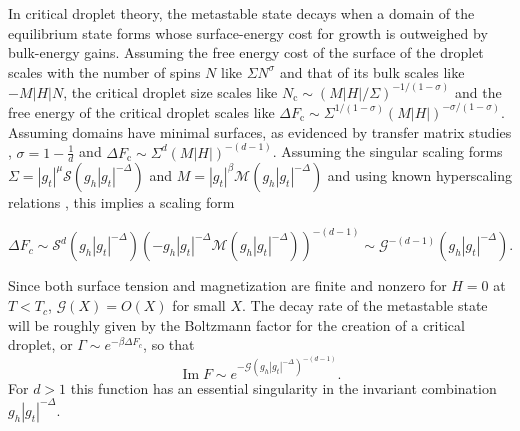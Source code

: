 \documentclass[aps,prl,reprint]{revtex4-1}
\def\[{\begin{equation}}
\def\]{\end{equation}}
\def\im{\mathop{\mathrm{Im}}\nolimits}
\def\O{O}
\def\c{\mathrm c}
\newif\ifreprint
\begin{document}
In critical droplet theory, the metastable state decays when a domain of the
equilibrium state forms whose surface-energy cost for growth is outweighed by
bulk-energy gains. Assuming the free energy cost of the surface of the droplet
scales with the number of spins $N$ like $\Sigma N^\sigma$ and that of its
bulk scales like $-M|H|N$, the critical droplet size scales like
$N_\c\sim(M|H|/\Sigma)^{-1/(1-\sigma)}$ and the free energy of the critical
droplet scales like $\Delta
F_\c\sim\Sigma^{1/(1-\sigma)}(M|H|)^{-\sigma/(1-\sigma)}$.  Assuming domains
have minimal surfaces, as evidenced by transfer matrix studies
\cite{gunther.1993.transfer-matrix}, $\sigma=1-\frac1d$ and $\Delta
F_\c\sim\Sigma^d(M|H|)^{-(d-1)}$. Assuming the singular scaling forms
$\Sigma=|g_t|^\mu\mathcal S(g_h|g_t|^{-\Delta})$ and $M=|g_t|^\beta\mathcal
M(g_h|g_t|^{-\Delta})$ and using known hyperscaling relations
\cite{widom.1981.interface}, this implies a scaling form
\def\eqcritformone{
  \sim\mathcal S^d(g_h|g_t|^{-\Delta})(-g_h|g_t|^{-\Delta}\mathcal
    M(g_h|g_t|^{-\Delta}))^{-(d-1)}
}
\def\eqcritformtwo{
  \sim\mathcal G^{-(d-1)}(g_h|g_t|^{-\Delta}).
}
\ifreprint
\[
  \begin{aligned}
    \Delta F_c&\eqcritformone
    \\
    &\eqcritformtwo
  \end{aligned}
\]
\else
\[
  \Delta F_c\eqcritformone\eqcritformtwo
\]
\fi
Since both surface tension and magnetization are finite and nonzero for $H=0$
at $T<T_c$, $\mathcal G(X)=\O(X)$ for small $X$.  The decay rate of the
metastable state will be roughly given by the Boltzmann factor for the
creation of a critical droplet, or $\Gamma\sim e^{-\beta\Delta F_c}$, so that
\[
  \im F\sim e^{-\mathcal G(g_h|g_t|^{-\Delta})^{-(d-1)}}.
\]
For $d>1$ this function has an essential singularity in the invariant
combination $g_h|g_t|^{-\Delta}$.
\end{document}
